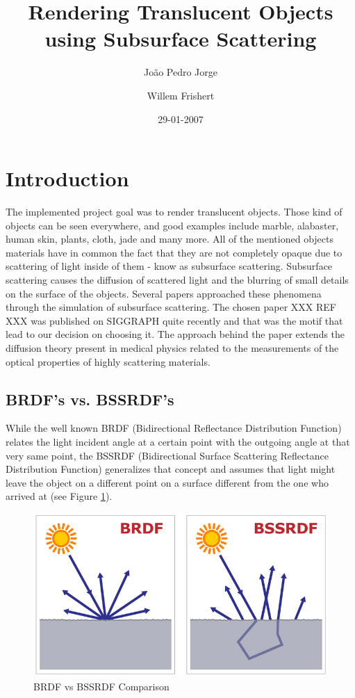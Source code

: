 \documentclass{article}
\title{Rendering Translucent Objects using Subsurface Scattering}
\author{Jo\~{a}o Pedro Jorge \and Willem Frishert}
\date{29-01-2007}
\begin{document}
\maketitle

\section{Introduction}
The implemented project goal was to render translucent objects. Those kind of objects can be seen everywhere, and good examples include marble, alabaster, human skin, plants, cloth, jade and many more.
All of the mentioned objects materials have in common the fact that they are not completely opaque due to scattering of light inside of them - know as subsurface scattering. Subsurface scattering causes the diffusion of scattered light and the blurring of small details on the surface of the objects.
Several papers approached these phenomena through the simulation of subsurface scattering. The chosen paper XXX REF XXX was published on SIGGRAPH quite recently and that was the motif that lead to our decision on choosing it. The approach behind the paper extends the diffusion theory present in medical physics related to the measurements of the optical properties of highly scattering materials.


\subsection{BRDF's vs. BSSRDF's}

While the well known BRDF (Bidirectional Reflectance Distribution Function) relates the light incident angle at a certain point with the outgoing angle at that very same point, the BSSRDF (Bidirectional Surface Scattering Reflectance Distribution Function) generalizes that concept and assumes that light might leave the object on a different point on a surface different from the one who arrived at (see Figure \ref{bssrdf_brdf}).

\begin{figure}[hbtp]
  \begin{center}
	\includegraphics[scale=0.5]{./Pictures/BSSRDF_BRDF.png}
    \caption{BRDF vs BSSRDF Comparison}
    \label{bssrdf_brdf}
  \end{center}
\end{figure}
\end{document}
